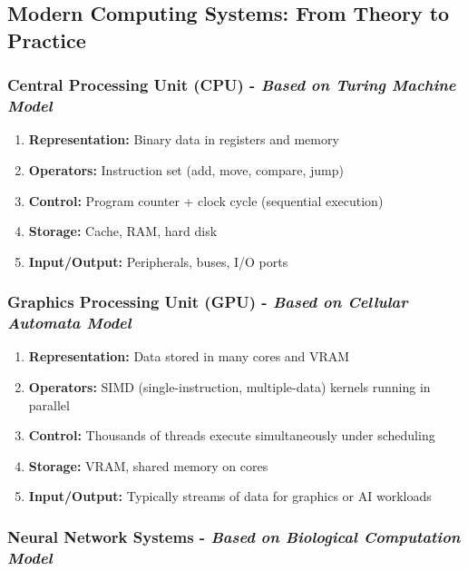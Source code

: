 \subsection{Modern Computing Systems: From Theory to Practice}
\label{subsec:modern-computing-systems}

\subsubsection{Central Processing Unit (CPU) - \textit{Based on Turing Machine Model}}
\label{subsubsec:cpu-turing-model}

\begin{enumerate}
\item \textbf{Representation:} Binary data in registers and memory
\item \textbf{Operators:} Instruction set (add, move, compare, jump)
\item \textbf{Control:} Program counter + clock cycle (sequential execution)
\item \textbf{Storage:} Cache, RAM, hard disk
\item \textbf{Input/Output:} Peripherals, buses, I/O ports
\end{enumerate}

\subsubsection{Graphics Processing Unit (GPU) - \textit{Based on Cellular Automata Model}}
\label{subsubsec:gpu-cellular-model}

\begin{enumerate}
\item \textbf{Representation:} Data stored in many cores and VRAM
\item \textbf{Operators:} SIMD (single-instruction, multiple-data) kernels running in parallel
\item \textbf{Control:} Thousands of threads execute simultaneously under scheduling
\item \textbf{Storage:} VRAM, shared memory on cores
\item \textbf{Input/Output:} Typically streams of data for graphics or AI workloads
\end{enumerate}

\subsubsection{Neural Network Systems - \textit{Based on Biological Computation Model}}
\label{subsubsec:nn-biological-model}

